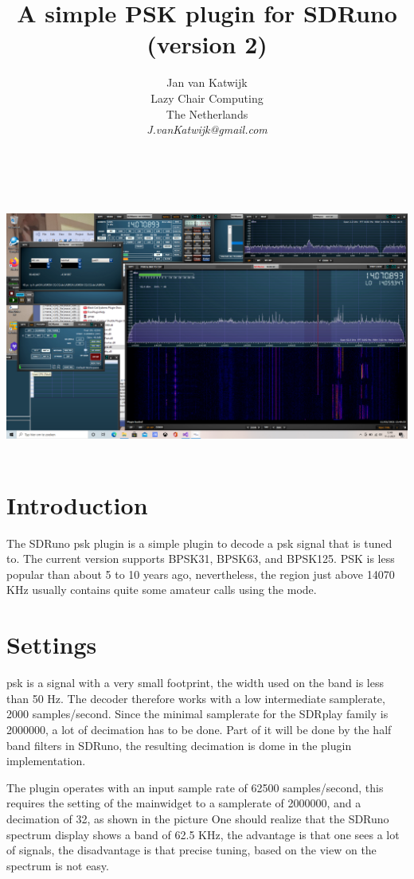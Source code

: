 \documentclass[11pt]{article}
\begin{document}
\title{A simple PSK plugin for SDRuno (version 2)}
\author{
Jan van Katwijk\\
Lazy Chair Computing \\
The Netherlands\\
{\em J.vanKatwijk@gmail.com}}
\maketitle
\ \\
\ \\
\includegraphics[width=160mm]{psk-example.png}
\ \\
\section{Introduction}
The SDRuno psk plugin is a simple plugin to decode a psk signal that
is tuned to. The current version supports BPSK31, BPSK63, and BPSK125.
PSK is less popular than about 5 to 10 years ago, nevertheless, the region
just above 14070 KHz usually contains quite some amateur calls using the
mode.

\section{Settings}
psk is a signal with a very small footprint, the width used on the band is
less than 50 Hz. The decoder therefore works with a low
 intermediate samplerate,  2000 samples/second.
Since the minimal samplerate for the
SDRplay family is 2000000, a lot of decimation has to be done.
Part of it will be done by the half band filters in SDRuno, the resulting
decimation is dome in the plugin implementation.
\par
The plugin operates with an input sample rate of 62500 samples/second,
this requires the setting of the mainwidget to a samplerate of 2000000,
and a decimation of 32, as shown in the picture
One should realize that the SDRuno spectrum display shows a band of 62.5
KHz, the advantage is that one sees a lot of signals, the disadvantage
is that precise tuning, based on the view on the spectrum is not easy.
\end{document}

